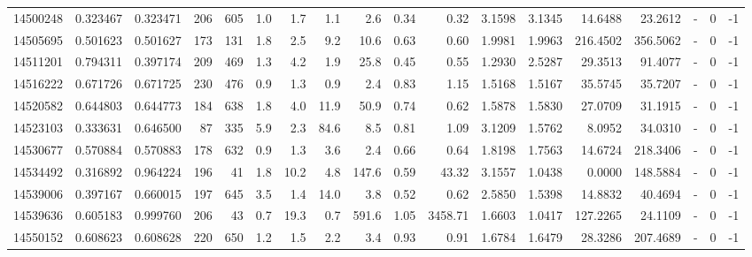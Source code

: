 \begin{tabular}{rrrrrrrrrrrrrrrlrr}
  14500248 & 0.323467 &   0.323471 &  206 &  605 &      1.0 &      1.7 &     1.1 &      2.6 &       0.34 &        0.32 &  3.1598 &  3.1345 &   14.6488 &   23.2612 &             - &        0 &         -1 \\
  14505695 & 0.501623 &   0.501627 &  173 &  131 &      1.8 &      2.5 &     9.2 &     10.6 &       0.63 &        0.60 &  1.9981 &  1.9963 &  216.4502 &  356.5062 &             - &        0 &         -1 \\
  14511201 & 0.794311 &   0.397174 &  209 &  469 &      1.3 &      4.2 &     1.9 &     25.8 &       0.45 &        0.55 &  1.2930 &  2.5287 &   29.3513 &   91.4077 &             - &        0 &         -1 \\
  14516222 & 0.671726 &   0.671725 &  230 &  476 &      0.9 &      1.3 &     0.9 &      2.4 &       0.83 &        1.15 &  1.5168 &  1.5167 &   35.5745 &   35.7207 &             - &        0 &         -1 \\
  14520582 & 0.644803 &   0.644773 &  184 &  638 &      1.8 &      4.0 &    11.9 &     50.9 &       0.74 &        0.62 &  1.5878 &  1.5830 &   27.0709 &   31.1915 &             - &        0 &         -1 \\
  14523103 & 0.333631 &   0.646500 &   87 &  335 &      5.9 &      2.3 &    84.6 &      8.5 &       0.81 &        1.09 &  3.1209 &  1.5762 &    8.0952 &   34.0310 &             - &        0 &         -1 \\
  14530677 & 0.570884 &   0.570883 &  178 &  632 &      0.9 &      1.3 &     3.6 &      2.4 &       0.66 &        0.64 &  1.8198 &  1.7563 &   14.6724 &  218.3406 &             - &        0 &         -1 \\
  14534492 & 0.316892 &   0.964224 &  196 &   41 &      1.8 &     10.2 &     4.8 &    147.6 &       0.59 &       43.32 &  3.1557 &  1.0438 &    0.0000 &  148.5884 &             - &        0 &         -1 \\
  14539006 & 0.397167 &   0.660015 &  197 &  645 &      3.5 &      1.4 &    14.0 &      3.8 &       0.52 &        0.62 &  2.5850 &  1.5398 &   14.8832 &   40.4694 &             - &        0 &         -1 \\
  14539636 & 0.605183 &   0.999760 &  206 &   43 &      0.7 &     19.3 &     0.7 &    591.6 &       1.05 &     3458.71 &  1.6603 &  1.0417 &  127.2265 &   24.1109 &             - &        0 &         -1 \\
  14550152 & 0.608623 &   0.608628 &  220 &  650 &      1.2 &      1.5 &     2.2 &      3.4 &       0.93 &        0.91 &  1.6784 &  1.6479 &   28.3286 &  207.4689 &             - &        0 &         -1 \\

\end{tabular}
